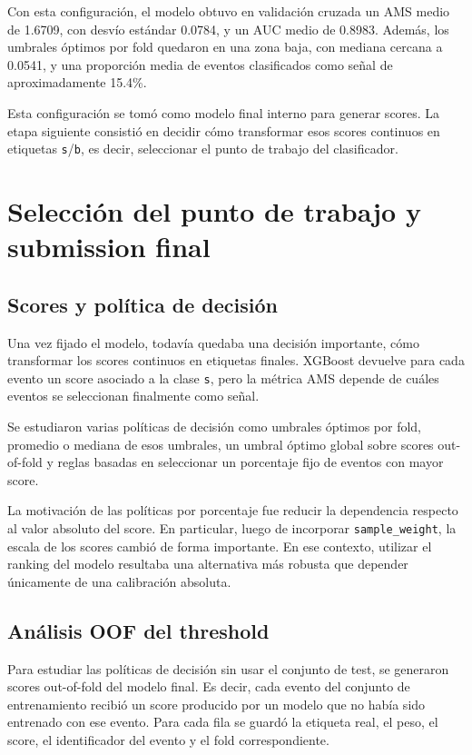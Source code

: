 \documentclass{article}
\begin{document}
Con esta configuración, el modelo obtuvo en validación cruzada un AMS medio de 1.6709, con desvío estándar 0.0784, y un AUC medio de 0.8983. Además, los umbrales óptimos por fold quedaron en una zona baja, con mediana cercana a 0.0541, y una proporción media de eventos clasificados como señal de aproximadamente 15.4\%.

Esta configuración se tomó como modelo final interno para generar scores. La etapa siguiente consistió en decidir cómo transformar esos scores continuos en etiquetas \texttt{s}/\texttt{b}, es decir, seleccionar el punto de trabajo del clasificador.

\section{Selección del punto de trabajo y submission final}
\subsection{Scores y política de decisión}
Una vez fijado el modelo, todavía quedaba una decisión importante, cómo transformar los scores continuos en etiquetas finales. XGBoost devuelve para cada evento un score asociado a la clase \texttt{s}, pero la métrica AMS depende de cuáles eventos se seleccionan finalmente como señal.

Se estudiaron varias políticas de decisión como umbrales óptimos por fold, promedio o mediana de esos umbrales, un umbral óptimo global sobre scores out-of-fold y reglas basadas en seleccionar un porcentaje fijo de eventos con mayor score.

La motivación de las políticas por porcentaje fue reducir la dependencia respecto al valor absoluto del score. En particular, luego de incorporar \texttt{sample\_weight}, la escala de los scores cambió de forma importante. En ese contexto, utilizar el ranking del modelo resultaba una alternativa más robusta que depender únicamente de una calibración absoluta.

\subsection{Análisis OOF del threshold}
Para estudiar las políticas de decisión sin usar el conjunto de test, se generaron scores out-of-fold del modelo final. Es decir, cada evento del conjunto de entrenamiento recibió un score producido por un modelo que no había sido entrenado con ese evento. Para cada fila se guardó la etiqueta real, el peso, el score, el identificador del evento y el fold correspondiente.
\end{document}
